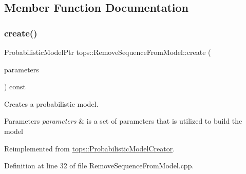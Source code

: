 \subsection{Member Function Documentation}
\mbox{\label{classtops_1_1RemoveSequenceFromModel_a46f4928e36936559659d9503c1edd550}} 
\subsubsection{\texorpdfstring{create()}{create()}}
{\footnotesize\ttfamily Probabilistic\+Model\+Ptr tops\+::\+Remove\+Sequence\+From\+Model\+::create (\begin{DoxyParamCaption}\item[{\hyperlink{classtops_1_1ProbabilisticModelParameters}{Probabilistic\+Model\+Parameters} \&}]{parameters }\end{DoxyParamCaption}) const\hspace{0.3cm}{\ttfamily [virtual]}}



Creates a probabilistic model. 


\begin{DoxyParams}{Parameters}
{\em parameters} & is a set of parameters that is utilized to build the model \\
\hline
\end{DoxyParams}


Reimplemented from \hyperlink{classtops_1_1ProbabilisticModelCreator_afed6c8ffa45fff446bdaa8b533da8f7c}{tops\+::\+Probabilistic\+Model\+Creator}.



Definition at line 32 of file Remove\+Sequence\+From\+Model.\+cpp.


